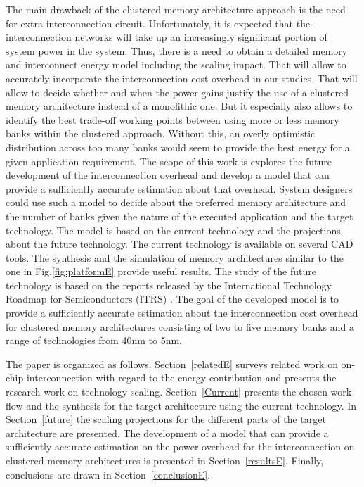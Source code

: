  The main drawback of the clustered memory architecture approach is the need for extra interconnection circuit.
 Unfortunately, it is expected that the interconnection networks will take up an increasingly significant portion of system power in the system. 
Thus, there is a need to obtain a detailed memory and interconnect energy model including the scaling impact. 
That will allow to accurately incorporate the interconnection cost overhead in our studies. 
That will allow to decide whether and when the power gains justify the use of a clustered memory architecture instead of a monolithic one. 
But it especially also allows to identify the best trade-off working points between using more
or less memory banks within the clustered approach. 
Without this, an overly optimistic distribution across too many banks would seem to provide the
best energy for a given application requirement.
  The scope of this work is explores the future development of the interconnection overhead and develop a model that can provide a sufficiently accurate estimation about that overhead.
  System designers could use such a model to decide about the preferred memory architecture and the number of banks given the nature of the executed application and the target technology.
  The model is based on the current technology and the projections about the future technology.
  The current technology is available on several CAD tools.
  The synthesis and the simulation of memory architectures similar to the one in Fig.\ref{fig:platformE} provide useful results.
  The study of the future technology is based on the reports released by the International Technology Roadmap for Semiconductors (ITRS) \cite{itrs}.
 The goal of the developed model is to provide a sufficiently accurate estimation about the interconnection cost overhead for clustered memory architectures consisting of two to five memory banks and a range of technologies from 40nm to 5nm.  
 
The paper is organized as follows.
Section~\ref{relatedE} surveys related work on on-chip interconnection with regard to the energy contribution and presents the research work on technology scaling. 
Section~\ref{Current} presents the chosen work-flow and the synthesis for the target architecture using the current technology.
In Section~\ref{future} the scaling projections for the different parts of the target architecture are presented.
The development of a model that can provide a sufficiently accurate estimation on the power overhead for the interconnection on clustered memory architectures is presented in Section~\ref{resultsE}.
Finally, conclusions are drawn in Section~\ref{conclusionE}.

